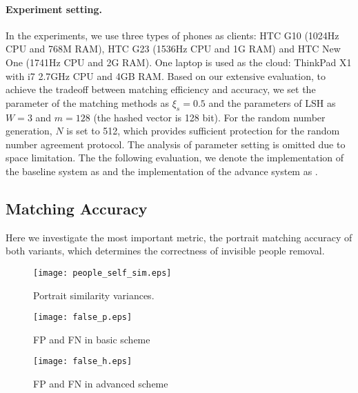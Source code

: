 \paragraph{Experiment setting.}
In the experiments,
 we use three types of phones as clients: HTC G10 (1024Hz CPU and 768M RAM),
 HTC G23 (1536Hz CPU and 1G RAM) and HTC New One (1741Hz CPU and 2G RAM).
One laptop is used as the cloud: ThinkPad X1 with i7 2.7GHz CPU and 4GB
RAM.
Based on our extensive evaluation, to achieve the tradeoff between matching efficiency and accuracy,
 we set the parameter of the matching methods as $\xi_s=0.5$ and the parameters of LSH as $W=3$ and $m=128$ (the hashed vector is 128 bit).
For the random number generation, $N$ is set to 512, which provides sufficient protection for the random number agreement protocol.
The analysis of parameter setting is omitted due to space limitation.
The the following evaluation,
 we denote the implementation of the baseline system as \basic
 and the implementation of the advance system as \advanced.






\vspace{-0.05in}
\subsection{Matching Accuracy}
\vspace{-0.05in}
Here we investigate the most important metric,
the portrait matching accuracy of both variants, which determines the correctness of invisible people removal.


\begin{figure*}[ht]
\begin{minipage}[t]{0.28\linewidth}
\centering
\texttt{[image: people\_self\_sim.eps]}
\caption{Portrait similarity variances.}
\label{fig:self-sim}
\end{minipage}
\vspace{-0.1in}
\hfill
\begin{minipage}[t]{0.28\linewidth}
\centering
\texttt{[image: false\_p.eps]}
\caption{FP and FN  in basic scheme}
\label{fig:false-basic}
\end{minipage}
\vspace{-0.1in}
\hfill
\begin{minipage}[t]{0.28\linewidth}
\centering
\texttt{[image: false\_h.eps]}
\caption{FP and FN in advanced scheme}
\label{fig:false-advance}
\end{minipage}
\vspace{-0.1in}
\end{figure*}




